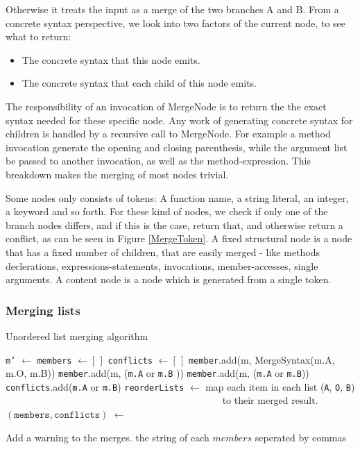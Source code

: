 \documentclass[11pt]{article}
\begin{document}
Otherwise it treats the input as a merge of the two branches A and B. From a concrete syntax perspective, we look into two factors of the current node, to see what to return:

\begin{itemize}
   \item The concrete syntax that this node emits.
   \item The concrete syntax that each child of this node emits.
\end{itemize}

The responsibility of an invocation of MergeNode is to return the the exact syntax needed for these specific node. Any work of generating concrete syntax for children is handled by a recursive call to MergeNode. For example a method invocation generate the opening and closing parenthesis, while the argument list be passed to another invocation, as well as the method-expression. This breakdown makes the merging of most nodes trivial.

Some nodes only consists of tokens: A function name, a string literal, an integer, a keyword and so forth. For these kind of nodes, we check if only one of the branch nodes differs, and if this is the case, return that, and otherwise return a conflict, as can be seen in Figure \ref{MergeToken}. A fixed structural node is a node that has a fixed number of children, that are easily merged - like methods declerations, expressions-statements, invocations, member-accesses, single arguments. A content node is a node which is generated from a single token.

\subsubsection{Merging lists}
\begin{algorithm}
  \caption{Unordered list merging algorithm}
  \label{Listmerger}
\begin{algorithmic}
    \State \texttt{m'} $\gets$ 
    \State \texttt{members} $\gets [\,]$
   	\State \texttt{conflicts} $\gets [\,]$
           \State \texttt{member}.add(m, MergeSyntax(m.A, m.O, m.B))
			\State \texttt{member}.add(m, (\texttt{m.A} or \texttt{m.B} ))
			\State \texttt{member}.add(m, (\texttt{m.A} or \texttt{m.B}))
			\State \texttt{conflicts}.add(\texttt{m.A} or \texttt{m.B})
		\EndIf
	\EndFor
	\State \texttt{reorderLists} $\gets$ map each item in each list (\texttt{A}, \texttt{O}, \texttt{B})
	\State ~~~~~~~~~~~~~~~~~~~~~~~~~~~~~~~~~~~~~~~~~~~~ to their merged result.
	\State $(\texttt{members}, \texttt{conflicts})$ $\gets$ 

        \State Add a warning to the merges.
    \EndFor
	\State \Return the string of each $members$ seperated by commas
\EndFunction
\end{algorithmic}
\end{algorithm}
\end{document}

